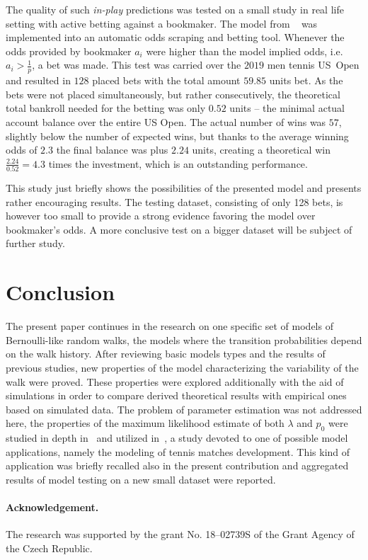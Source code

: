 \documentclass[runningheads]{CMSIM}
\begin{document}
    The quality of such \emph{in-play} predictions was tested on a small study in real life setting with active betting against a bookmaker.
    The model from ~\cite{ja2019mathsport_proc} was implemented into an automatic odds scraping and betting tool.
    Whenever the odds provided by bookmaker $a_{i}$  were higher than the model implied odds, i.e. $a_{i}>\frac{1}{p}$, a bet was made.
    This test was carried over the $2019$ men tennis US~Open and resulted in $128$ placed bets with the total amount $59.85$ units bet.
    As the bets were not placed simultaneously, but rather consecutively, the theoretical total bankroll needed for the betting was only $0.52$ units -- the minimal actual account balance over the entire US Open.
    The actual number of wins was $57$, slightly below the number of expected wins, but thanks to the average winning odds of $2.3$ the final balance was plus $2.24$ units,
    creating a theoretical win $\frac{2.24}{0.52}=4.3$ times the investment, which is an outstanding performance.

    This study just briefly shows the possibilities of the presented model and presents rather encouraging results.
    The testing dataset, consisting of only 128 bets, is however too small to provide a strong evidence favoring the model over bookmaker's odds.
    A more conclusive test on a bigger dataset will be subject of further study.


    \section{Conclusion}\label{sec:conclusion}

    The present paper continues in the research on one specific set of
    models of Bernoulli-like random walks, the models where the transition
    probabilities depend on the walk history.
    After reviewing basic models
    types and the results of previous studies, new
    properties of the model characterizing the variability of the walk were proved.
    These properties were explored additionally with the aid
    of simulations in order to compare derived theoretical results with
    empirical ones based on simulated data.
    The problem of parameter
    estimation was not addressed here, the properties of the maximum likelihood
    estimate of both $\lambda$ and $p_{0}$ were studied in depth in~\cite{ja2019apmat} and utilized in~\cite{ja2019mathsport_proc},
    a study devoted to one of possible model applications, namely the
    modeling of tennis matches development.
    This kind of application was briefly recalled also in the present contribution and aggregated results of model testing on a new small dataset were reported.

    \paragraph{Acknowledgement.}
    The research was supported by the grant No. 18--02739S of the Grant Agency of the Czech Republic.


    
    
\end{document}

